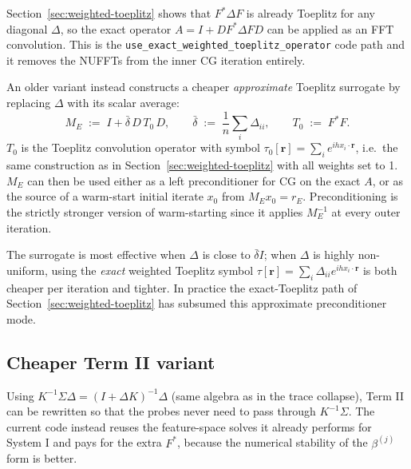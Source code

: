 \documentclass{article}
\begin{document}
Section~\ref{sec:weighted-toeplitz} shows that $F^{*}\Delta F$ is already Toeplitz for any diagonal $\Delta$, so the exact operator $A=I+DF^{*}\Delta FD$ can be applied as an FFT convolution. This is the \texttt{use\_exact\_weighted\_toeplitz\_operator} code path and it removes the NUFFTs from the inner CG iteration entirely.

An older variant instead constructs a cheaper \emph{approximate} Toeplitz surrogate by replacing $\Delta$ with its scalar average:
\[
  M_E \;:=\; I + \bar\delta\,D\,T_{0}\,D,
  \qquad
  \bar\delta \;:=\; \frac{1}{n}\sum_i\Delta_{ii},
  \qquad
  T_{0} \;:=\; F^{*}F.
\]
$T_{0}$ is the Toeplitz convolution operator with symbol $\tau_{0}[\bm{r}]=\sum_i e^{ih x_i\cdot\bm{r}}$, i.e.\ the same construction as in Section~\ref{sec:weighted-toeplitz} with all weights set to 1. $M_E$ can then be used either as a left preconditioner for CG on the exact $A$, or as the source of a warm-start initial iterate $x_0$ from $M_E x_0 = r_E$. Preconditioning is the strictly stronger version of warm-starting since it applies $M_E^{-1}$ at every outer iteration.

The surrogate is most effective when $\Delta$ is close to $\bar\delta I$; when $\Delta$ is highly non-uniform, using the \emph{exact} weighted Toeplitz symbol $\tau[\bm{r}]=\sum_i\Delta_{ii}e^{ihx_i\cdot\bm{r}}$ is both cheaper per iteration and tighter. In practice the exact-Toeplitz path of Section~\ref{sec:weighted-toeplitz} has subsumed this approximate preconditioner mode.

\subsection{Cheaper Term II variant}
\label{app:cheap-term2}

Using $K^{-1}\Sigma\Delta = (I+\Delta K)^{-1}\Delta$ (same algebra as in the trace collapse), Term II can be rewritten so that the probes never need to pass through $K^{-1}\Sigma$. The current code instead reuses the feature-space solves it already performs for System I and pays for the extra $F^{*}$, because the numerical stability of the $\beta^{(j)}$ form is better.
\end{document}
